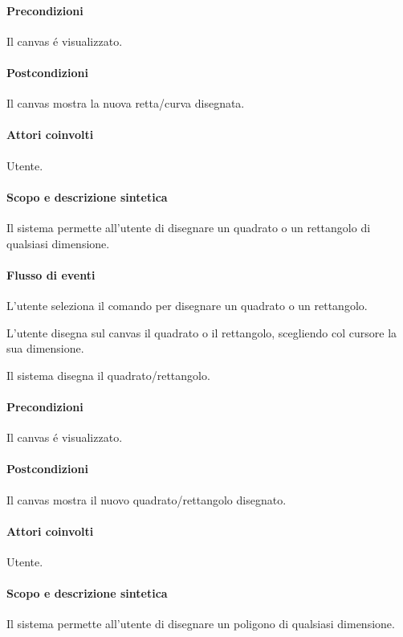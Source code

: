 \paragraph{Precondizioni} Il canvas \'e visualizzato.
\paragraph{Postcondizioni} Il canvas mostra la nuova retta/curva disegnata.

\paragraph{Attori coinvolti} Utente.
\paragraph{Scopo e descrizione sintetica} 
Il sistema permette all'utente di disegnare un quadrato o un rettangolo di qualsiasi dimensione.
\paragraph{Flusso di eventi}
\begin{elenconumerato}[\textbf{}]{\subsubsecindent}
\item L'utente seleziona il comando per disegnare un quadrato o un rettangolo.
\item L'utente disegna sul canvas il quadrato o il rettangolo, scegliendo col cursore la sua dimensione.
\item Il sistema disegna il quadrato/rettangolo.
\end{elenconumerato}
\paragraph{Precondizioni} Il canvas \'e visualizzato.
\paragraph{Postcondizioni} Il canvas mostra il nuovo quadrato/rettangolo disegnato.

\paragraph{Attori coinvolti} Utente.
\paragraph{Scopo e descrizione sintetica} 
Il sistema permette all'utente di disegnare un poligono di qualsiasi dimensione.
